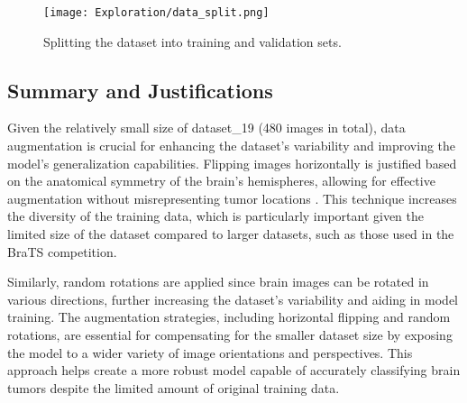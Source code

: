 \begin{figure}[H]
  \begin{center}
    \texttt{[image: Exploration/data\_split.png]}
  \end{center}
  \caption{Splitting the dataset into training and validation sets.}\label{fig:data_split}
\end{figure}


\subsection{Summary and Justifications}

Given the relatively small size of dataset\_19 (480 images in total), data augmentation is crucial for enhancing the dataset's variability and improving the model's generalization capabilities. Flipping images horizontally is justified based on the anatomical symmetry of the brain's hemispheres, allowing for effective augmentation without misrepresenting tumor locations \cite{nalepa_data_2019}. This technique increases the diversity of the training data, which is particularly important given the limited size of the dataset compared to larger datasets, such as those used in the BraTS competition.

Similarly, random rotations are applied since brain images can be rotated in various directions, further increasing the dataset's variability and aiding in model training. The augmentation strategies, including horizontal flipping and random rotations, are essential for compensating for the smaller dataset size by exposing the model to a wider variety of image orientations and perspectives. This approach helps create a more robust model capable of accurately classifying brain tumors despite the limited amount of original training data.

